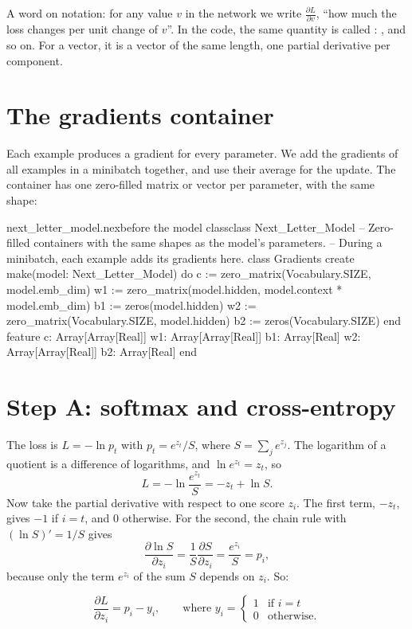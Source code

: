 \documentclass[11pt,a4paper,oneside,openany]{book}
\newcommand{\code}[1]{\texttt{\detokenize{#1}}}
\newcommand{\pd}[2]{\frac{\partial #1}{\partial #2}}
\begin{document}
A word on notation: for any value $v$ in the network we write
$\pd{L}{v}$, ``how much the loss changes per unit change of $v$''. In the
code, the same quantity is called \code{dv}: \code{dz}, \code{dh} and so
on. For a vector, it is a vector of the same length, one partial
derivative per component.

\section{The gradients container}

Each example produces a gradient for every parameter. We add the
gradients of all examples in a minibatch together, and use their average
for the update. The container has one zero-filled matrix or vector per
parameter, with the same shape:

\begin{addbefore}{next_letter_model.nex}{before the model class}{class Next_Letter_Model}
-- Zero-filled containers with the same shapes as the model's parameters.
-- During a minibatch, each example adds its gradients here.
class Gradients
create
  make(model: Next_Letter_Model) do
    c := zero_matrix(Vocabulary.SIZE, model.emb_dim)
    w1 := zero_matrix(model.hidden, model.context * model.emb_dim)
    b1 := zeros(model.hidden)
    w2 := zero_matrix(Vocabulary.SIZE, model.hidden)
    b2 := zeros(Vocabulary.SIZE)
  end
feature
  c: Array[Array[Real]]
  w1: Array[Array[Real]]
  b1: Array[Real]
  w2: Array[Array[Real]]
  b2: Array[Real]
end
\end{addbefore}

\section{Step A: softmax and cross-entropy}

The loss is $L = -\ln p_t$ with $p_t = e^{z_t}/S$, where
$S = \sum_j e^{z_j}$. The logarithm of a quotient is a difference of
logarithms, and $\ln e^{z_t} = z_t$, so
\[
  L = -\ln\frac{e^{z_t}}{S} = -z_t + \ln S .
\]
Now take the partial derivative with respect to one score $z_i$. The first
term, $-z_t$, gives $-1$ if $i = t$, and 0 otherwise. For the second, the
chain rule with $(\ln S)' = 1/S$ gives
\[
  \pd{\ln S}{z_i} = \frac{1}{S}\pd{S}{z_i} = \frac{e^{z_i}}{S} = p_i ,
\]
because only the term $e^{z_i}$ of the sum $S$ depends on $z_i$. So:

\begin{mathbox}[Step A]
\[
  \pd{L}{z_i} = p_i - y_i,
  \qquad\text{where } y_i = \begin{cases} 1 & \text{if } i = t\\ 0 & \text{otherwise.}\end{cases}
\]
\end{mathbox}
\end{document}
